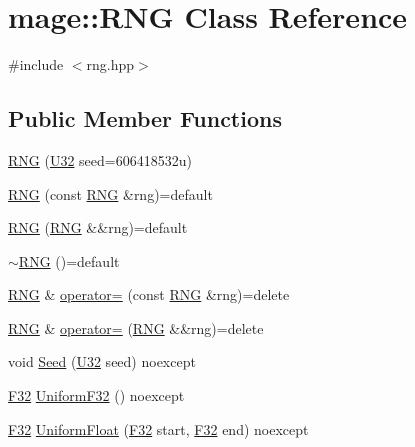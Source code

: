 \hypertarget{classmage_1_1_r_n_g}{}\section{mage\+:\+:R\+NG Class Reference}
\label{classmage_1_1_r_n_g}


{\ttfamily \#include $<$rng.\+hpp$>$}

\subsection*{Public Member Functions}
\begin{DoxyCompactItemize}
\item 
\mbox{\hyperlink{classmage_1_1_r_n_g_a381a917dce1f2d319859b700a4410ffc}{R\+NG}} (\mbox{\hyperlink{namespacemage_a41c104c036fba3756a74e19f793eeaa1}{U32}} seed=606418532u)
\item 
\mbox{\hyperlink{classmage_1_1_r_n_g_ae85dd3ab6679a308610880779d65955a}{R\+NG}} (const \mbox{\hyperlink{classmage_1_1_r_n_g}{R\+NG}} \&rng)=default
\item 
\mbox{\hyperlink{classmage_1_1_r_n_g_aea109c4ab1644a5294d7c2c1031a50c9}{R\+NG}} (\mbox{\hyperlink{classmage_1_1_r_n_g}{R\+NG}} \&\&rng)=default
\item 
\mbox{\hyperlink{classmage_1_1_r_n_g_a20d24aabf31837e48a38b9ca221b0a9b}{$\sim$\+R\+NG}} ()=default
\item 
\mbox{\hyperlink{classmage_1_1_r_n_g}{R\+NG}} \& \mbox{\hyperlink{classmage_1_1_r_n_g_a38a0a4296338162fe105012cb4d13318}{operator=}} (const \mbox{\hyperlink{classmage_1_1_r_n_g}{R\+NG}} \&rng)=delete
\item 
\mbox{\hyperlink{classmage_1_1_r_n_g}{R\+NG}} \& \mbox{\hyperlink{classmage_1_1_r_n_g_ac9155db13a3d4b7f44a4f800085197a2}{operator=}} (\mbox{\hyperlink{classmage_1_1_r_n_g}{R\+NG}} \&\&rng)=delete
\item 
void \mbox{\hyperlink{classmage_1_1_r_n_g_a1d7bc2fd5525a252d4900f5dd4754162}{Seed}} (\mbox{\hyperlink{namespacemage_a41c104c036fba3756a74e19f793eeaa1}{U32}} seed) noexcept
\item 
\mbox{\hyperlink{namespacemage_aa97e833b45f06d60a0a9c4fc22ae02c0}{F32}} \mbox{\hyperlink{classmage_1_1_r_n_g_a94e3e2dc84e277c3dba004da386941f9}{Uniform\+F32}} () noexcept
\item 
\mbox{\hyperlink{namespacemage_aa97e833b45f06d60a0a9c4fc22ae02c0}{F32}} \mbox{\hyperlink{classmage_1_1_r_n_g_a43acf77450062519dedd3e492614317d}{Uniform\+Float}} (\mbox{\hyperlink{namespacemage_aa97e833b45f06d60a0a9c4fc22ae02c0}{F32}} start, \mbox{\hyperlink{namespacemage_aa97e833b45f06d60a0a9c4fc22ae02c0}{F32}} end) noexcept
\end{DoxyCompactItemize}

